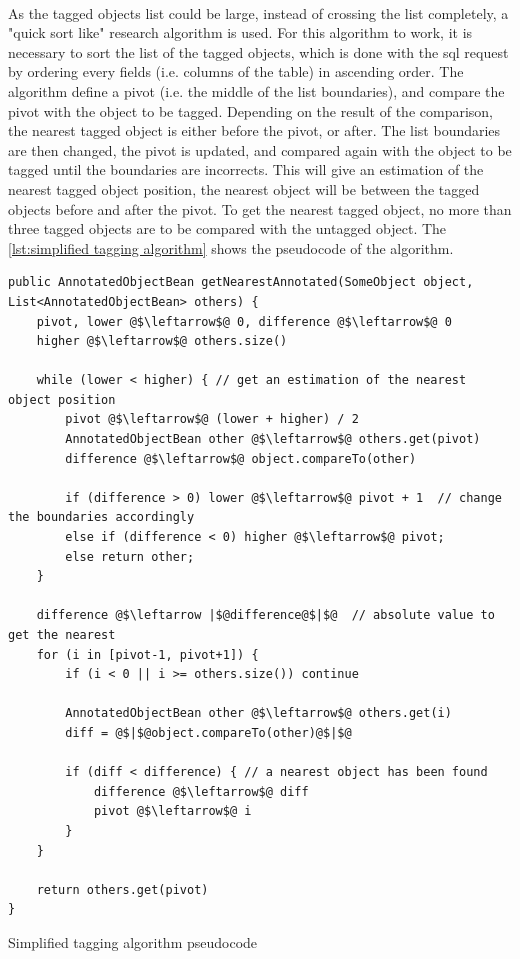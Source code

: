 ~~

As the tagged objects list could be large, instead of crossing the list completely, a "quick sort like" research algorithm is used. For this algorithm to work, it is necessary to sort the list of the tagged objects, which is done with the sql request by ordering every fields (i.e. columns of the table) in ascending order. The algorithm define a pivot (i.e. the middle of the list boundaries), and compare the pivot with the object to be tagged. Depending on the result of the comparison, the nearest tagged object is either before the pivot, or after. The list boundaries are then changed, the pivot is updated, and compared again with the object to be tagged until the boundaries are incorrects. This will give an estimation of the nearest tagged object position, the nearest object will be between the tagged objects before and after the pivot. To get the nearest tagged object, no more than three tagged objects are to be compared with the untagged object. The \vref{lst:simplified tagging algorithm} shows the pseudocode of the algorithm.

\begin{listing}
	\begin{verbatim}
public AnnotatedObjectBean getNearestAnnotated(SomeObject object, List<AnnotatedObjectBean> others) {
	pivot, lower @$\leftarrow$@ 0, difference @$\leftarrow$@ 0
	higher @$\leftarrow$@ others.size()
	
	while (lower < higher) { // get an estimation of the nearest object position 
		pivot @$\leftarrow$@ (lower + higher) / 2
		AnnotatedObjectBean other @$\leftarrow$@ others.get(pivot)
		difference @$\leftarrow$@ object.compareTo(other)
		
		if (difference > 0) lower @$\leftarrow$@ pivot + 1  // change the boundaries accordingly 
		else if (difference < 0) higher @$\leftarrow$@ pivot;
		else return other;
	}
	
	difference @$\leftarrow |$@difference@$|$@  // absolute value to get the nearest
	for (i in [pivot-1, pivot+1]) {
		if (i < 0 || i >= others.size()) continue
		
		AnnotatedObjectBean other @$\leftarrow$@ others.get(i)
		diff = @$|$@object.compareTo(other)@$|$@
		
		if (diff < difference) { // a nearest object has been found
			difference @$\leftarrow$@ diff
			pivot @$\leftarrow$@ i
		}
	}
	
	return others.get(pivot)	
}
	\end{verbatim}
	\caption{Simplified tagging algorithm pseudocode}
	\label{lst:simplified tagging algorithm}
\end{listing}



